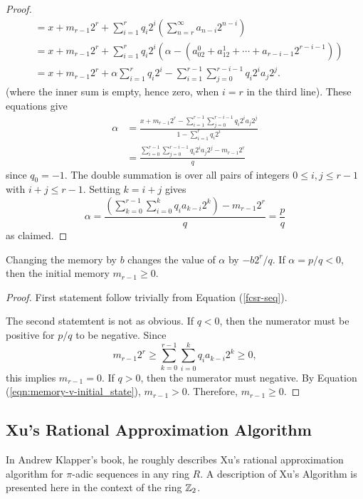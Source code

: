 \begin{proof}
\begin{align*}
          &=x+m_{r-1}2^r+\sum_{i=1}^r{q_i2^i}\left(\sum_{n=r}^\infty a_{n-i}2^{n-i}\right)\\
          &=x+m_{r-1}2^r+\sum_{i=1}^r{q_i2^i}(\alpha-(a_02^0+a_12^1+\cdots+a_{r-i-1}2^{r-i-1}))\\
          &=x+m_{r-1}2^r+\alpha\sum_{i=1}^r{q_i2^i}-\sum_{i=1}^{r-1}\sum_{j=0}^{r-i-1}q_i2^ia_j2^j.
  \end{align*}
  (where the inner sum is empty, hence zero, when $i=r$ in the third line).
  These equations give
  \begin{align*}
    \alpha&=\frac{x+m_{r-1}2^r-\sum_{i=1}^{r-1}\sum_{j=0}^{r-i-1}q_i2^ia_j2^j}
                {1-\sum_{i=1}^r q_i2^i}\\
          &=\frac{\sum_{i=0}^{r-1}\sum_{j=0}^{r-i-1}q_i2^ia_j2^j-m_{r-1}2^r}{q}
  \end{align*}
  since $q_0=-1$. The double summation is over all pairs of integers $0\leq i,j
  \leq r-1$ with $i+j\leq r-1$. Setting $k=i+j$ gives
  \begin{equation}\label{eqn:fcsr-seq}
    \alpha=\frac{\left(\sum_{k=0}^{r-1}\sum_{i=0}^kq_ia_{k-i}2^k\right)-m_{r-1}2^r}{q}
          =\frac{p}{q}
  \end{equation}
  as claimed.
\end{proof}

\begin{corollary}
  \par Changing the memory by $b$ changes the value of $\alpha$ by $-b2^r/q$. If
  $\alpha=p/q<0$, then the initial memory $m_{r-1}\geq 0$.
\end{corollary}
\begin{proof}
  \par First statement follow trivially from Equation (\ref{fcsr-seq}).
  \par The second statemtent is not as obvious. If $q<0$, then the numerator
  must be positive for $p/q$ to be negative. Since
  \begin{equation}\label{eqn:memory-v-initial_state}
    m_{r-1}2^r\geq\sum_{k=0}^{r-1}\sum_{i=0}^kq_ia_{k-i}2^k\geq0,
  \end{equation}
  this implies $m_{r-1}=0$. If $q>0$, then the numerator must negative.
  By Equation (\ref{eqn:memory-v-initial_state}), $m_{r-1}>0$. Therefore,
  $m_{r-1}\geq0$.
\end{proof}

\subsection{Xu's Rational Approximation Algorithm}
\par In Andrew Klapper's book, he roughly describes Xu's rational approximation
algorithm for $\pi$-adic sequences in any ring $R$. A description of Xu's Algorithm
is presented here in the context of the ring $\mathbb{Z}_2$.

